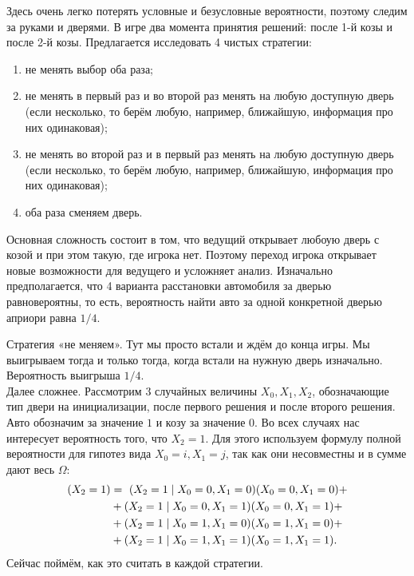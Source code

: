 \documentclass[12pt]{article}
\let\P\relax
\DeclareMathOperator{\P}{\mathbb{P}}
\begin{document}
\begin{enumerate}
    
    Здесь очень легко потерять условные и безусловные вероятности, поэтому следим за руками и дверями. 
    В игре два момента принятия решений: после 1-й козы и после 2-й козы. 
    Предлагается исследовать 4 чистых стратегии:
    
    \begin{enumerate}
    \item не менять выбор оба раза;
    \item не менять в первый раз и во второй раз менять на любую доступную дверь (если несколько, то берём любую, например, ближайшую, информация про них одинаковая);
    \item не менять во второй раз и в первый раз менять на любую доступную дверь (если несколько, то берём любую, например, ближайшую, информация про них одинаковая);
    \item оба раза сменяем дверь.
    \end{enumerate}
    
    Основная сложность состоит в том, что ведущий открывает любоую дверь с козой и при этом такую, где игрока нет. 
    Поэтому переход игрока открывает новые возможности для ведущего и усложняет анализ. 
    Изначально предполагается, что 4 варианта расстановки автомобиля за дверью равновероятны, то есть, вероятность найти авто за одной конкретной дверью априори равна $1/4$.
    
    Стратегия «не меняем». Тут мы просто встали и ждём до конца игры. Мы выигрываем тогда и только тогда, когда встали на нужную дверь изначально. Вероятность выигрыша $1/4$.\\
    
    Далее сложнее. Рассмотрим $3$ случайных величины $X_0,X_1,X_2$, обозначающие тип двери на инициализации, после первого решения и после второго решения. Авто обозначим за значение $1$ и козу за значение $0$. Во всех случаях нас интересует вероятность того, что $X_2=1$. Для этого используем формулу полной вероятности для гипотез вида $X_0=i,X_1=j$, так как они несовместны и в сумме дают весь $\Omega$:
    \begin{align*}
    \P(X_2=1) &= ~ \P(X_2=1 \mid X_0=0, X_1=0) \P(X_0=0,X_1=0) +\\
    &+ \P(X_2=1 \mid X_0=0, X_1=1) \P(X_0=0,X_1=1) +\\
    &+ \P(X_2=1 \mid X_0=1, X_1=0) \P(X_0=1,X_1=0) +\\
    &+ \P(X_2=1 \mid X_0=1, X_1=1) \P(X_0=1,X_1=1).
    \end{align*}
    Сейчас поймём, как это считать в каждой стратегии.
    

\end{enumerate}
\end{document}
